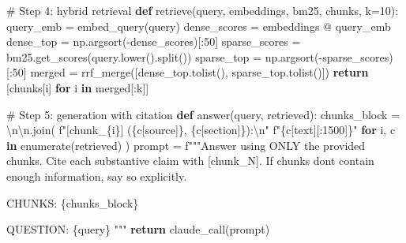 \documentclass[
  letterpaper,
  11pt]{scrbook}
\newenvironment{Shaded}{\begin{snugshade}}{\end{snugshade}}
\newcommand{\BuiltInTok}[1]{\textcolor[rgb]{0.00,0.23,0.31}{#1}}
\newcommand{\CharTok}[1]{\textcolor[rgb]{0.13,0.47,0.30}{#1}}
\newcommand{\CommentTok}[1]{\textcolor[rgb]{0.37,0.37,0.37}{#1}}
\newcommand{\ControlFlowTok}[1]{\textcolor[rgb]{0.00,0.23,0.31}{\textbf{#1}}}
\newcommand{\DecValTok}[1]{\textcolor[rgb]{0.68,0.00,0.00}{#1}}
\newcommand{\KeywordTok}[1]{\textcolor[rgb]{0.00,0.23,0.31}{\textbf{#1}}}
\newcommand{\NormalTok}[1]{\textcolor[rgb]{0.00,0.23,0.31}{#1}}
\newcommand{\OperatorTok}[1]{\textcolor[rgb]{0.37,0.37,0.37}{#1}}
\newcommand{\SpecialCharTok}[1]{\textcolor[rgb]{0.37,0.37,0.37}{#1}}
\newcommand{\SpecialStringTok}[1]{\textcolor[rgb]{0.13,0.47,0.30}{#1}}
\newcommand{\StringTok}[1]{\textcolor[rgb]{0.13,0.47,0.30}{#1}}
\begin{document}
\begin{Shaded}
\begin{Highlighting}[]
\CommentTok{\# Step 4: hybrid retrieval}
\KeywordTok{def}\NormalTok{ retrieve(query, embeddings, bm25, chunks, k}\OperatorTok{=}\DecValTok{10}\NormalTok{):}
\NormalTok{    query\_emb }\OperatorTok{=}\NormalTok{ embed\_query(query)}
\NormalTok{    dense\_scores }\OperatorTok{=}\NormalTok{ embeddings }\OperatorTok{@}\NormalTok{ query\_emb}
\NormalTok{    dense\_top }\OperatorTok{=}\NormalTok{ np.argsort(}\OperatorTok{{-}}\NormalTok{dense\_scores)[:}\DecValTok{50}\NormalTok{]}
\NormalTok{    sparse\_scores }\OperatorTok{=}\NormalTok{ bm25.get\_scores(query.lower().split())}
\NormalTok{    sparse\_top }\OperatorTok{=}\NormalTok{ np.argsort(}\OperatorTok{{-}}\NormalTok{sparse\_scores)[:}\DecValTok{50}\NormalTok{]}
\NormalTok{    merged }\OperatorTok{=}\NormalTok{ rrf\_merge([dense\_top.tolist(),}
\NormalTok{                        sparse\_top.tolist()])}
    \ControlFlowTok{return}\NormalTok{ [chunks[i] }\ControlFlowTok{for}\NormalTok{ i }\KeywordTok{in}\NormalTok{ merged[:k]]}

\CommentTok{\# Step 5: generation with citation}
\KeywordTok{def}\NormalTok{ answer(query, retrieved):}
\NormalTok{    chunks\_block }\OperatorTok{=} \StringTok{\textquotesingle{}}\CharTok{\textbackslash{}n\textbackslash{}n}\StringTok{\textquotesingle{}}\NormalTok{.join(}
        \SpecialStringTok{f"[chunk\_}\SpecialCharTok{\{}\NormalTok{i}\SpecialCharTok{\}}\SpecialStringTok{] (}\SpecialCharTok{\{}\NormalTok{c[}\StringTok{\textquotesingle{}source\textquotesingle{}}\NormalTok{]}\SpecialCharTok{\}}\SpecialStringTok{, }\SpecialCharTok{\{}\NormalTok{c[}\StringTok{\textquotesingle{}section\textquotesingle{}}\NormalTok{]}\SpecialCharTok{\}}\SpecialStringTok{):}\CharTok{\textbackslash{}n}\SpecialStringTok{"}
        \SpecialStringTok{f"}\SpecialCharTok{\{}\NormalTok{c[}\StringTok{\textquotesingle{}text\textquotesingle{}}\NormalTok{][:}\DecValTok{1500}\NormalTok{]}\SpecialCharTok{\}}\SpecialStringTok{"}
        \ControlFlowTok{for}\NormalTok{ i, c }\KeywordTok{in} \BuiltInTok{enumerate}\NormalTok{(retrieved)}
\NormalTok{    )}
\NormalTok{    prompt }\OperatorTok{=} \SpecialStringTok{f"""Answer using ONLY the provided chunks.}
\SpecialStringTok{Cite each substantive claim with [chunk\_N]. If chunks}
\SpecialStringTok{don\textquotesingle{}t contain enough information, say so explicitly.}

\SpecialStringTok{CHUNKS:}
\SpecialCharTok{\{}\NormalTok{chunks\_block}\SpecialCharTok{\}}

\SpecialStringTok{QUESTION: }\SpecialCharTok{\{}\NormalTok{query}\SpecialCharTok{\}}
\SpecialStringTok{"""}
    \ControlFlowTok{return}\NormalTok{ claude\_call(prompt)}
\end{Highlighting}
\end{Shaded}
\end{document}
